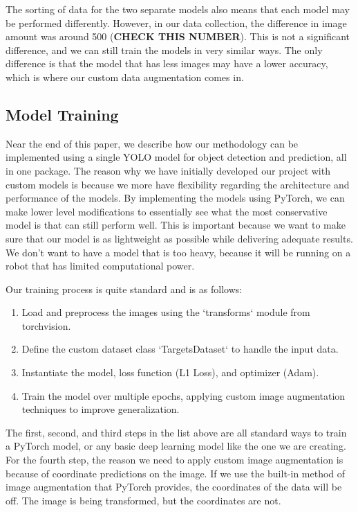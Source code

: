 The sorting of data for the two separate models also means that each model may be performed differently. However, in our data collection, the difference in image amount was around 500 (\textbf{CHECK THIS NUMBER}). This is not a significant difference, and we can still train the models in very similar ways. The only difference is that the model that has less images may have a lower accuracy, which is where our custom data augmentation comes in.


\subsection{Model Training}
Near the end of this paper, we describe how our methodology can be implemented using a single YOLO model for object detection and prediction, all in one package. The reason why we have initially developed our project with custom models is because we more have flexibility regarding the architecture and performance of the models. By implementing the models using PyTorch, we can make lower level modifications to essentially see what the most conservative model is that can still perform well. This is important because we want to make sure that our model is as lightweight as possible while delivering adequate results. We don't want to have a model that is too heavy, because it will be running on a robot that has limited computational power.

Our training process is quite standard and is as follows:
\begin{enumerate}
    \item Load and preprocess the images using the `transforms` module from torchvision.
    \item Define the custom dataset class `TargetsDataset` to handle the input data.
    \item Instantiate the model, loss function (L1 Loss), and optimizer (Adam).
    \item Train the model over multiple epochs, applying custom image augmentation techniques to improve generalization.
\end{enumerate}

The first, second, and third steps in the list above are all standard ways to train a PyTorch model, or any basic deep learning model like the one we are creating. For the fourth step, the reason we need to apply custom image augmentation is because of coordinate predictions on the image. If we use the built-in method of image augmentation that PyTorch provides, the coordinates of the data will be off. The image is being transformed, but the coordinates are not. 

